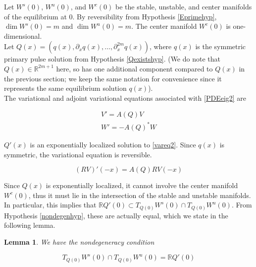 \documentclass[12pt]{article}
\def\R{{\mathbb R}}
\newtheorem{lemma}{Lemma}
\begin{document}
Let $W^s(0)$, $W^u(0)$, and $W^c(0)$ be the stable, unstable, and center manifolds of the equilibrium at 0. By reversibility from Hypothesis \ref{Eprimehyp}, $\dim W^s(0) = m$ and $\dim W^u(0) = m$. The center manifold $W^c(0)$ is one-dimensional.\\

Let $Q(x) = (q(x), \partial_x q(x), \dots, \partial_x^{2m} q(x))$, where $q(x)$ is the symmetric primary pulse solution from Hypothesis \ref{Qexistshyp}. (We do note that $Q(x) \in \R^{2m+1}$ here, so has one additional component compared to $Q(x)$ in the previous section; we keep the same notation for convenience since it represents the same equilibrium solution $q(x)$). \\

The variational and adjoint variational equations associated with \eqref{PDEeig2} are

\begin{align}
V' = A(Q) V \label{vareq2} \\
W' = -A(Q)^* W \label{adjvareq2}
\end{align}

$Q'(x)$ is an exponentially localized solution to \eqref{vareq2}. Since $q(x)$ is symmetric, the variational equation is reversible.

\begin{equation}\label{genODErev}
(RV)'(-x) = A(Q) RV(-x)
\end{equation}

Since $Q(x)$ is exponentially localized, it cannot involve the center manifold $W^c(0)$, thus it must lie in the intersection of the stable and unstable manifolds. In particular, this implies that $\R Q'(0) \subset T_{Q(0)}W^s(0) \cap T_{Q(0)}W^u(0)$. From Hypothesis \ref{nondegenhyp}, these are actually equal, which we state in the following lemma.

\begin{lemma}\label{nondegenlemma}
We have the nondegeneracy condition

\begin{equation}\label{nondegen2}
T_{Q(0)}W^s(0) \cap T_{Q(0)}W^u(0) = \R Q'(0)
\end{equation}

\end{lemma}
\end{document}
